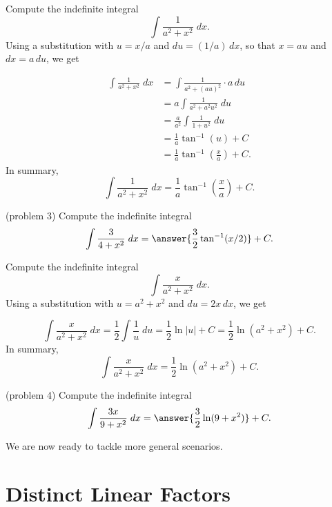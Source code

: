 \documentclass{ximera}
\begin{document}
\begin{example}[example 3]
Compute the indefinite integral
\[
\int \frac{1}{a^2 + x^2} \; dx.
\]
Using a substitution with $u = x/a$ and $du = (1/a) \, dx$, so that $x = au$ and $dx = a \, du$, we get

\begin{align*}
 \int \frac{1}{a^2 + x^2} \; dx &= \int \frac{1}{a^2 + (au)^2} \cdot a\, du   \\
 &= a\int \frac{1}{a^2 + a^2u^2} \; du   \\
 &= \frac{a}{a^2} \int \frac{1}{1+u^2} \; du \\
 &= \frac{1}{a} \tan^{-1}(u) + C \\
 &= \frac{1}{a} \tan^{-1}\left(\frac{x}{a}\right) + C.
 \end{align*}
 In summary,
 \[
\int \frac{1}{a^2 + x^2} \; dx =  \frac{1}{a} \tan^{-1}\left(\frac{x}{a}\right) + C.
\]
 \end{example}
 
 \begin{problem}(problem 3)
 Compute the indefinite integral
 \[
 \int \frac{3}{4+x^2} \; dx = \answer{\frac32 \tan^{-1}(x/2)} + C.
\]

 \end{problem}
 
 
\begin{example}[example 4]
Compute the indefinite integral
\[
\int \frac{x}{a^2 + x^2} \; dx.
\]
Using a substitution with $u = a^2 + x^2$ and $du = 2x \, dx$, we get

 \[
 \int \frac{x}{a^2 + x^2} \; dx = \frac12 \int \frac{1}{u} \; du   =  \frac{1}{2} \ln|u| + C =    
 \frac{1}{2} \ln(a^2 + x^2) + C.
 \]
 In summary,
 \[
\int \frac{x}{a^2 + x^2} \; dx =  \frac{1}{2}\ln(a^2 + x^2)  + C.
\]
 \end{example}
 
 \begin{problem}(problem 4)
 Compute the indefinite integral
 \[
 \int \frac{3x}{9+x^2} \; dx = \answer{\frac32 \ln(9+ x^2)} + C.
\]

 \end{problem}
               
                    
We are now ready to tackle more general scenarios.

\section{Distinct Linear Factors}
\end{document}
